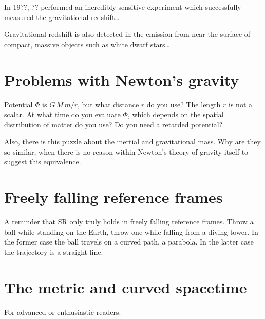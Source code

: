 In 19??, ?? performed an incredibly sensitive experiment which
successfully measured the gravitational redshift\ldots

Gravitational redshift is also detected in the emission from near the
surface of compact, massive objects such as white dwarf stars\ldots


\section{Problems with Newton's gravity}

Potential $\Phi$ is $G\,M\,m/r$, but what distance $r$ do you use?
The length $r$ is not a scalar.  At what time do you evaluate $\Phi$,
which depends on the spatial distribution of matter do you use?  Do
you need a retarded potential?

Also, there is this puzzle about the inertial and gravitational mass.
Why are they so similar, when there is no reason within Newton's
theory of gravity itself to suggest this equivalence.


\section{Freely falling reference frames}

A reminder that SR only truly holds in freely falling reference
frames.  Throw a ball while standing on the Earth, throw one while
falling from a diving tower.  In the former case the ball travels on a
curved path, a parabola.  In the latter case the trajectory is a
straight line.


\section{The metric and curved spacetime}

For advanced or enthusiastic readers.

